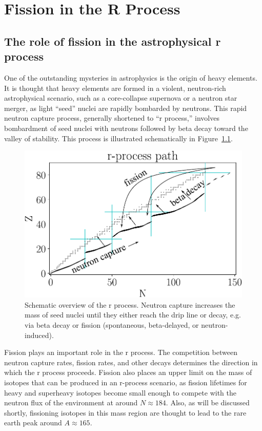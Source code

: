 \chapter{Fission in the R Process}\label{chap:rprocess}

\section{The role of fission in the astrophysical r process}
One of the outstanding mysteries in astrophysics is the origin of heavy elements. It is thought that heavy elements are formed in a violent, neutron-rich astrophysical scenario, such as a core-collapse supernova or a neutron star merger, as light ``seed'' nuclei are rapidly bombarded by neutrons. This rapid neutron capture process, generally shortened to ``r process,'' involves bombardment of seed nuclei with neutrons followed by beta decay toward the valley of stability.  This process is illustrated schematically in Figure~\ref{fig:rprocpath}.

\begin{figure}
	\centering
	\includegraphics[width=0.8\linewidth]{TeX_files/rProc_path}
	\caption[Schematic overview of the r process]{Schematic overview of the r process. Neutron capture increases the mass of seed nuclei until they either reach the drip line or decay, e.g. via beta decay or fission (spontaneous, beta-delayed, or neutron-induced).}
	\label{fig:rprocpath}
\end{figure}

Fission plays an important role in the r process. The competition between neutron capture rates, fission rates, and other decays determines the direction in which the r process proceeds. Fission also places an upper limit on the mass of isotopes that can be produced in an r-process scenario, as fission lifetimes for heavy and superheavy isotopes become small enough to compete with the neutron flux of the environment at around $N\approx184$. Also, as will be discussed shortly, fissioning isotopes in this mass region are thought to lead to the rare earth peak around $A\approx165$.

